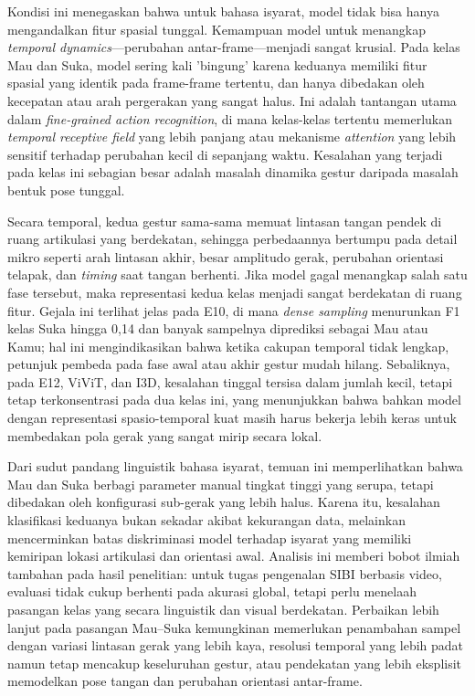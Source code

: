 Kondisi ini menegaskan bahwa untuk bahasa isyarat, model tidak bisa hanya mengandalkan fitur spasial tunggal. Kemampuan model untuk menangkap \textit{temporal dynamics}---perubahan antar-frame---menjadi sangat krusial. Pada kelas Mau dan Suka, model sering kali 'bingung' karena keduanya memiliki fitur spasial yang identik pada frame-frame tertentu, dan hanya dibedakan oleh kecepatan atau arah pergerakan yang sangat halus. Ini adalah tantangan utama dalam \textit{fine-grained action recognition}, di mana kelas-kelas tertentu memerlukan \textit{temporal receptive field} yang lebih panjang atau mekanisme \textit{attention} yang lebih sensitif terhadap perubahan kecil di sepanjang waktu. Kesalahan yang terjadi pada kelas ini sebagian besar adalah masalah dinamika gestur daripada masalah bentuk pose tunggal.\par

Secara temporal, kedua gestur sama-sama memuat lintasan tangan pendek di ruang artikulasi yang berdekatan, sehingga perbedaannya bertumpu pada detail mikro seperti arah lintasan akhir, besar amplitudo gerak, perubahan orientasi telapak, dan \textit{timing} saat tangan berhenti. Jika model gagal menangkap salah satu fase tersebut, maka representasi kedua kelas menjadi sangat berdekatan di ruang fitur. Gejala ini terlihat jelas pada E10, di mana \textit{dense sampling} menurunkan F1 kelas Suka hingga 0{,}14 dan banyak sampelnya diprediksi sebagai Mau atau Kamu; hal ini mengindikasikan bahwa ketika cakupan temporal tidak lengkap, petunjuk pembeda pada fase awal atau akhir gestur mudah hilang. Sebaliknya, pada E12, ViViT, dan I3D, kesalahan tinggal tersisa dalam jumlah kecil, tetapi tetap terkonsentrasi pada dua kelas ini, yang menunjukkan bahwa bahkan model dengan representasi spasio-temporal kuat masih harus bekerja lebih keras untuk membedakan pola gerak yang sangat mirip secara lokal.\par

Dari sudut pandang linguistik bahasa isyarat, temuan ini memperlihatkan bahwa Mau dan Suka berbagi parameter manual tingkat tinggi yang serupa, tetapi dibedakan oleh konfigurasi sub-gerak yang lebih halus. Karena itu, kesalahan klasifikasi keduanya bukan sekadar akibat kekurangan data, melainkan mencerminkan batas diskriminasi model terhadap isyarat yang memiliki kemiripan lokasi artikulasi dan orientasi awal. Analisis ini memberi bobot ilmiah tambahan pada hasil penelitian: untuk tugas pengenalan SIBI berbasis video, evaluasi tidak cukup berhenti pada akurasi global, tetapi perlu menelaah pasangan kelas yang secara linguistik dan visual berdekatan. Perbaikan lebih lanjut pada pasangan Mau--Suka kemungkinan memerlukan penambahan sampel dengan variasi lintasan gerak yang lebih kaya, resolusi temporal yang lebih padat namun tetap mencakup keseluruhan gestur, atau pendekatan yang lebih eksplisit memodelkan pose tangan dan perubahan orientasi antar-frame.\par

